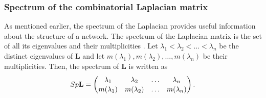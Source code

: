 \documentclass[10pt,a4paper]{article}
\theoremstyle{plain}
\theoremstyle{definition}
\begin{document}
\subsubsection{Spectrum of the combinatorial Laplacian matrix}
As mentioned earlier, the spectrum of the Laplacian provides useful information about the structure of a network. The spectrum of the Laplacian matrix is the set of all its eigenvalues and their multiplicities \citep{estrada2011structure}. Let $\lambda_1 < \lambda_2 < \ldots < \lambda_n$ be the distinct eigenvalues of $\mathbf{L}$ and let $m(\lambda_1),m(\lambda_2), \ldots,m(\lambda_n)$ be their multiplicities. Then, the spectrum of $\mathbf{L}$ is written as
\begin{eqnarray}
Sp\mathbf{L} = 
\renewcommand*{\arraystretch}{1.1}
\begin{pmatrix*}
\lambda_1 & \lambda_2 & \ldots & \lambda_n \\
m(\lambda_1) & m(\lambda_2) & \ldots & m(\lambda_n)
\end{pmatrix*}.
\end{eqnarray}
\end{document}
